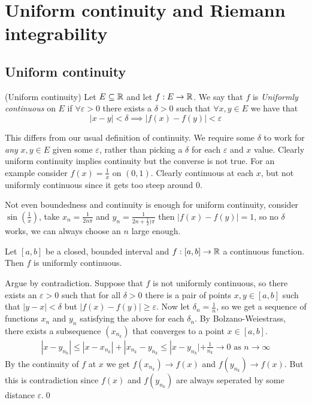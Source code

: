 \documentclass{article}
\newcommand{\eps}{\varepsilon}
\begin{document}
\section{Uniform continuity and Riemann integrability}
\subsection{Uniform continuity}
\begin{definition}
	(Uniform continuity) Let $ E\subseteq \mathbb{R} $ and let $ f:E\to \mathbb{R} $. We say that $ f $ is \textit{Uniformly continuous} on $ E $ if $ \forall \eps>0 $ there exists a $ \delta>0 $ such that $ \forall x,y\in E $ we have that
	\[
	  |x-y|<\delta\implies |f(x)-f(y)|<\eps
	\]
\end{definition}
This differs from our usual definition of continuity. We require some $ \delta $ to work for \textit{any} $ x,y\in E $ given some $ \eps $, rather than picking a $ \delta $ for each $ \eps $ and $ x $ value. Clearly uniform continuity implies continuity but the converse is not true. For an example consider $ f(x)=\frac 1x $ on $ (0,1) $. Clearly continuous at each $ x $, but not uniformly continuous since it gets too steep around $ 0 $.\par
Not even boundedness and continuity is enough for uniform continuity, consider $ \sin(\frac 1x) $, take $ x_n=\frac 1{2n\pi} $ and $ y_n=\frac 1{2n+\frac 12)\pi} $ then $ |f(x)-f(y)|=1 $, so no $ \delta $ works, we can always choose an $ n $ large enough.
\begin{theorem}
	Let $ [a,b] $ be a closed, bounded interval and $ f:[a,b]\to \mathbb{R} $ a continuous function. Then $ f $ is uniformly continuous.
\end{theorem}
\pf Argue by contradiction. Suppose that $ f $ is not uniformly continuous, so there exists an $ \eps>0 $ such that for all $ \delta>0 $ there is a pair of points $ x,y\in [a,b] $ such that $ |y-x|<\delta $ but $ |f(x)-f(y)|\ge \eps $. Now let $ \delta_n=\frac 1n $, so we get a sequence of functions $ x_n $ and $ y_n $ satisfying the above for each $ \delta_n $. By Bolzano-Weiestrass, there exists a subsequence $ (x_{n_k}) $ that converges to a point $ x\in [a,b] $.
\begin{align*}
	|x-y_{n_k}|\le |x-x_{n_k}|+|x_{n_k}-y_{n_k}\le |x-y_{n_k}|+\frac 1{n_k}\to 0\text{ as } n\to\infty 
\end{align*}
By the continuity of $ f $ at $ x $ we get $ f(x_{n_k})\to f(x) $ and $ f(y_{n_k})\to f(x) $. But this is contradiction since $ f(x) $ and $ f(y_{n_k}) $ are always seperated by some distance $ \eps $.\qed\par
\end{document}
